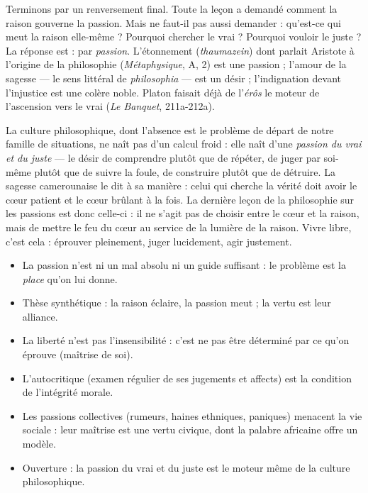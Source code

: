 \documentclass[11pt]{article}
\begin{document}
Terminons par un renversement final. Toute la leçon a demandé comment la raison gouverne la passion. Mais ne faut-il pas aussi demander : qu'est-ce qui meut la raison elle-même ? Pourquoi chercher le vrai ? Pourquoi vouloir le juste ? La réponse est : par \emph{passion}. L'étonnement (\emph{thaumazein}) dont parlait Aristote à l'origine de la philosophie (\emph{Métaphysique}, A, 2) est une passion ; l'amour de la sagesse — le sens littéral de \emph{philosophia} — est un désir ; l'indignation devant l'injustice est une colère noble. Platon faisait déjà de l'\emph{érôs} le moteur de l'ascension vers le vrai (\emph{Le Banquet}, 211a-212a).

La culture philosophique, dont l'absence est le problème de départ de notre famille de situations, ne naît pas d'un calcul froid : elle naît d'une \emph{passion du vrai et du juste} — le désir de comprendre plutôt que de répéter, de juger par soi-même plutôt que de suivre la foule, de construire plutôt que de détruire. La sagesse camerounaise le dit à sa manière : celui qui cherche la vérité doit avoir le cœur patient et le cœur brûlant à la fois. La dernière leçon de la philosophie sur les passions est donc celle-ci : il ne s'agit pas de choisir entre le cœur et la raison, mais de mettre le feu du cœur au service de la lumière de la raison. Vivre libre, c'est cela : éprouver pleinement, juger lucidement, agir justement.

\begin{aretenir}
\begin{itemize}
\item La passion n'est ni un mal absolu ni un guide suffisant : le problème est la \emph{place} qu'on lui donne.
\item Thèse synthétique : la raison éclaire, la passion meut ; la vertu est leur alliance.
\item La liberté n'est pas l'insensibilité : c'est ne pas être déterminé par ce qu'on éprouve (maîtrise de soi).
\item L'autocritique (examen régulier de ses jugements et affects) est la condition de l'intégrité morale.
\item Les passions collectives (rumeurs, haines ethniques, paniques) menacent la vie sociale : leur maîtrise est une vertu civique, dont la palabre africaine offre un modèle.
\item Ouverture : la passion du vrai et du juste est le moteur même de la culture philosophique.
\end{itemize}
\end{aretenir}
\end{document}
